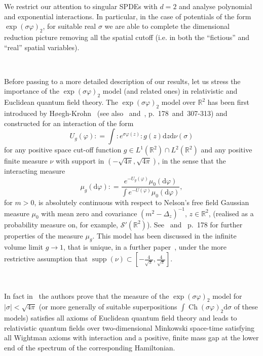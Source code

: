 \documentclass[a4paper,10pt]{article}
\newcommand{\mathd}{\mathrm{d}}
\newcommand{\tmop}[1]{\ensuremath{\operatorname{#1}}}
\begin{document}
We restrict our attention to singular SPDEs with $d = 2$ and analyse
polynomial and exponential interactions. In particular, in the case of
potentials of the form $\exp (\sigma \varphi)_2$, for suitable real $\sigma$
we are able to complete the dimensional reduction picture removing all the
spatial cutoff (i.e. in both the ``fictious'' and ``real'' spatial variables).

\

Before passing to a more detailed description of our results, let us stress
the importance of the $\exp (\sigma \varphi)_2$ model (and related ones) in
relativistic and Euclidean quantum field theory. The $\exp (\sigma \varphi)_2$
model over $\mathbb{R}^2$ has been first introduced by
H{\o}egh-Krohn~{\cite{Krohn1971}} (see also~{\cite{Krohn1974}}
and~{\cite{Simon1974}}, p.~178~and~307-313) and constructed for an interaction
of the form
\[ U_g (\varphi) : = \int : e^{\sigma \varphi (z)} : g (z) \mathd z \mathd \nu
   (\sigma) \]
for any positive space cut-off function $g \in L^1 (\mathbb{R}^2) \cap L^2
(\mathbb{R}^2)$ and any positive finite measure $\nu$ with support in $(-
\sqrt{4 \pi}, \sqrt{4 \pi})$, in the sense that the interacting measure
\[ \mu_g (\mathd \varphi) : = \frac{e^{- U_g (\varphi)} \mu_0 (\mathd
   \varphi)}{\int e^{- U (\varphi)} \mu_0 (\mathd \varphi)}, \]
for $m > 0$, is absolutely continuous with respect to Nelson's free field
Gaussian measure $\mu_0$ with mean zero and covariance $(m^2 - \Delta_z)^{-
1}$, $z \in \mathbb{R}^2$, (realised as a probability measure on, for example,
$\mathcal{S}' (\mathbb{R}^2)$). See~{\cite{Krohn1974,Krohn1971}}
and~{\cite{Simon1974}} p.~178 for further properties of the measure $\mu_g$.
This model has been discussed in the infinite volume limit $g \rightarrow 1$,
that is unique, in a further paper~{\cite{Krohn1974}}, under the more
restrictive assumption that $\tmop{supp} (\nu) \subset \left[ -
\frac{4}{\sqrt{\pi}}, \frac{4}{\sqrt{\pi}} \right]$.

\

In fact in~{\cite{Krohn1974}} the authors prove that the measure of the $\exp
(\sigma \varphi)_2$ model for $| \sigma | < \sqrt{4 \pi}$ (or more generally
of suitable superpositions $\int \tmop{Ch} (\sigma \varphi)_2 \mathd \sigma$
of these models) satisfies all axioms of Euclidean quantum field theory and
leads to relativistic quantum fields over two-dimensional Minkowski space-time
satisfying all Wightman axioms with interaction and a positive, finite mass
gap at the lower end of the spectrum of the corresponding Hamiltonian.
\end{document}
